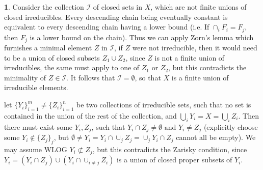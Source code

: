 \documentclass[10.5pt]{article}
\theoremstyle{definition}
\newtheorem{pb}{}
\newcommand{\set}[1]{\{#1\}}
\newcommand{\tand}[1]{\text{ and }}
\newcommand{\tor}[1]{\text{ or }}
\begin{document}
    \begin{pb}
        Consider the collection \(\mathcal{I}\) of closed sets in \(X\), which are not finite unions of closed irreducibles. Every descending chain being eventually constant is equivalent to every descending chain having a lower bound
        (i.e. If \(\cap_i F_i = F_j\), then \(F_j\) is a lower bound on the chain).
        Thus we can apply Zorn's lemma which furnishes a minimal element \(Z\) in \(\mathcal{I}\), if \(Z\) were not irreducible, then it would need to be a union of closed subsets \(Z_1\cup Z_2\),
        since \(Z\) is not a finite union of irreducibles, the same must apply to one of \(Z_1 \tor ZZ_2\), but this contradicts the minimality of \(Z \in \mathcal{I}\). It follows that
        \(\mathcal{I} = \emptyset\), so that \(X\) is a finite union of irreducible elements.

        let \(\set{Y_i}_{i = 1}^m \neq \set{Z_i}_{i = 1}^n\) be two collections
        of irreducible sets, such that no set is contained in the union of the rest of the collection, and \(\bigcup_i Y_i = X = \bigcup_i Z_i\).
        Then there must exist some \(Y_i, Z_j\), such that \(Y_i \cap Z_j \neq \emptyset \tand YY_i \neq Z_j\)
        (explicitly choose some \(Y_i \not \in \set{Z_j}_j\), but \(\emptyset \neq Y_i = Y_i \cap \cup_j Z_j = \cup_j Y_i \cap Z_j\)
         cannot all be empty). We may assume WLOG \(Y_i \not \subset Z_j\), but this contradicts the Zarisky condition, since 
        \(Y_i = (Y_i \cap Z_j) \cup (Y_i \cap \cup_{i \neq j}Z_i)\) is a union of closed proper subsets of \(Y_i\).
    \end{pb}
\end{document}
